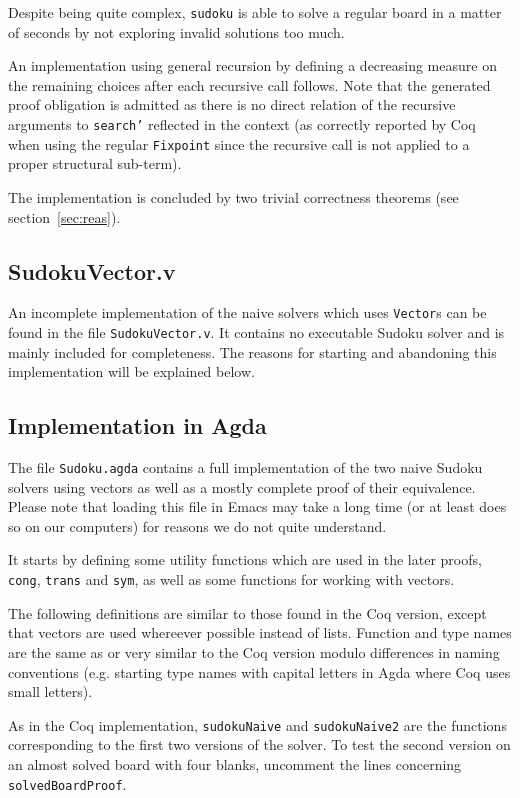 \documentclass[a4paper,11pt]{article}
\begin{document}
Despite being quite complex, \texttt{sudoku} is able to solve a regular board in a matter of seconds by not exploring invalid solutions too much.

An implementation using general recursion by defining a decreasing measure on the remaining choices after each recursive call follows. Note that the generated proof obligation is admitted as there is no direct relation of the recursive arguments to \texttt{search'} reflected in the context (as correctly reported by Coq when using the regular \texttt{Fixpoint} since the recursive call is not applied to a proper structural sub-term).

The implementation is concluded by two trivial correctness theorems (see section~\ref{sec:reas}).

\subsection{SudokuVector.v}
An incomplete implementation of the naive solvers which uses \texttt{Vector}s can be found in the file \texttt{SudokuVector.v}. It contains no executable Sudoku solver and is mainly included for completeness. The reasons for starting and abandoning this implementation will be explained below.

\subsection{Implementation in Agda}
The file \texttt{Sudoku.agda} contains a full implementation of the two naive Sudoku solvers using vectors as well as a mostly complete proof of their equivalence. Please note that loading this file in Emacs may take a long time (or at least does so on our computers) for reasons we do not quite understand.

It starts by defining some utility functions which are used in the later proofs, \texttt{cong}, \texttt{trans} and \texttt{sym}, as well as some functions for working with vectors.

The following definitions are similar to those found in the Coq version, except that vectors are used whereever possible instead of lists. Function and type names are the same as or very similar to the Coq version modulo differences in naming conventions (e.g. starting type names with capital letters in Agda where Coq uses small letters). 

As in the Coq implementation, \texttt{sudokuNaive} and \texttt{sudokuNaive2} are the functions corresponding to the first two versions of the solver. To test the second version on an almost solved board with four blanks, uncomment the lines concerning \texttt{solvedBoardProof}.
\end{document}
